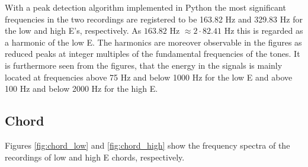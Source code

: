 With a peak detection algorithm implemented in Python the most significant frequencies in the two recordings are registered to be 163.82 Hz and 329.83 Hz for the low and high E's, respectively. As $163.82$ Hz $\approx 2\cdot82.41$ Hz this is regarded as a harmonic of the low E. The harmonics are moreover observable in the figures as reduced peaks at integer multiples of the fundamental frequencies of the tones. It is furthermore seen from the figures, that the energy in the signals is mainly located at frequencies above 75 Hz and below 1000 Hz for the low E and above 100 Hz and below 2000 Hz for the high E.\\ 

\subsection{Chord}
Figures \ref{fig:chord_low} and \ref{fig:chord_high} show the frequency spectra of the recordings of low and high E chords, respectively.
